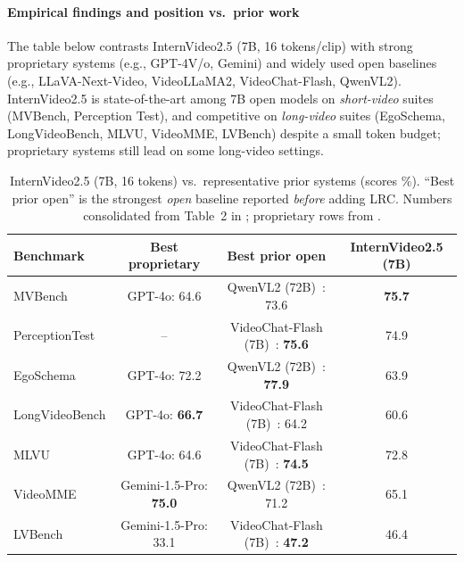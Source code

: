 \begin{enrichment}
\begin{enrichment}
        \paragraph{Empirical findings and position vs.\ prior work}
        \noindent
        The table below contrasts InternVideo2.5 (7B, 16 tokens/clip) with strong proprietary systems (e.g., GPT-4V/o, Gemini) and widely used open baselines (e.g., LLaVA-Next-Video, VideoLLaMA2, VideoChat-Flash, QwenVL2). InternVideo2.5 is state-of-the-art among 7B open models on \emph{short-video} suites (MVBench, Perception Test), and competitive on \emph{long-video} suites (EgoSchema, LongVideoBench, MLVU, VideoMME, LVBench) despite a small token budget; proprietary systems still lead on some long-video settings.
        
        \begin{table}[H]
            \centering
            \scriptsize
            \setlength{\tabcolsep}{5pt}
            \caption{InternVideo2.5 (7B, 16 tokens) vs.\ representative prior systems (scores \%). “Best prior open” is the strongest \emph{open} baseline reported \emph{before} adding LRC. Numbers consolidated from Table~2 in \cite{wang2025internvideo2_5}; proprietary rows from \cite{openai2023b_gpt4v,team2023_gemini}.}
            \label{tab:iv25_compact_vs_baselines}
            \begin{tabular}{@{}lccc@{}}
                \toprule
                \textbf{Benchmark} & \textbf{Best proprietary} & \textbf{Best prior open} & \textbf{InternVideo2.5 (7B)} \\
                \midrule
                MVBench              & GPT\mbox{-}4o: 64.6 & QwenVL2 (72B)~\cite{bai2023_qwenvl2}: 73.6 & \textbf{75.7} \\
                PerceptionTest       & --                   & VideoChat\mbox{-}Flash (7B)~\cite{li2024_mvbench}: \textbf{75.6} & 74.9 \\
                EgoSchema            & GPT\mbox{-}4o: 72.2 & QwenVL2 (72B)~\cite{bai2023_qwenvl2}: \textbf{77.9} & 63.9 \\
                LongVideoBench       & GPT\mbox{-}4o: \textbf{66.7} & VideoChat\mbox{-}Flash (7B)~\cite{li2024_mvbench}: 64.2 & 60.6 \\
                MLVU                 & GPT\mbox{-}4o: 64.6 & VideoChat\mbox{-}Flash (7B)~\cite{li2024_mvbench}: \textbf{74.5} & 72.8 \\
                VideoMME             & Gemini\mbox{-}1.5\mbox{-}Pro: \textbf{75.0} & QwenVL2 (72B)~\cite{bai2023_qwenvl2}: 71.2 & 65.1 \\
                LVBench              & Gemini\mbox{-}1.5\mbox{-}Pro: 33.1 & VideoChat\mbox{-}Flash (7B)~\cite{li2024_mvbench}: \textbf{47.2} & 46.4 \\
                \bottomrule
            \end{tabular}
        \end{table}
        

\end{enrichment}
\end{enrichment}
